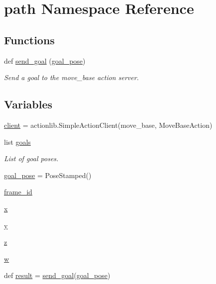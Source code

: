 \hypertarget{namespacepath}{}\section{path Namespace Reference}
\label{namespacepath}
\subsection*{Functions}
\begin{DoxyCompactItemize}
\item 
def \hyperlink{namespacepath_a2db4ca25204e9a7df7493344494d5a10}{send\+\_\+goal} (\hyperlink{namespacepath_a293cea0a504fa4dcccc4e27229ca89ae}{goal\+\_\+pose})
\begin{DoxyCompactList}\small\item\em Send a goal to the move\+\_\+base action server. \end{DoxyCompactList}\end{DoxyCompactItemize}
\subsection*{Variables}
\begin{DoxyCompactItemize}
\item 
\hyperlink{namespacepath_afeeab767bfbbb7e3c54d5df73bfdb8d8}{client} = actionlib.\+Simple\+Action\+Client(\textquotesingle{}move\+\_\+base\textquotesingle{}, Move\+Base\+Action)
\item 
list \hyperlink{namespacepath_a877836c262e905b21652b96e33c06fc5}{goals}
\begin{DoxyCompactList}\small\item\em List of goal poses. \end{DoxyCompactList}\item 
\hyperlink{namespacepath_a293cea0a504fa4dcccc4e27229ca89ae}{goal\+\_\+pose} = Pose\+Stamped()
\item 
\hyperlink{namespacepath_a4cc7d1dff632eb836dcba3e28c989d10}{frame\+\_\+id}
\item 
\hyperlink{namespacepath_afe6191924049eb7f282c32e77c383d23}{x}
\item 
\hyperlink{namespacepath_a2b9fe9b689f51d56430ac93944f60795}{y}
\item 
\hyperlink{namespacepath_a568fb423fb5588e9d0a43fa8a38b88c5}{z}
\item 
\hyperlink{namespacepath_a6b3a1b480dee3e2ccc2fda3d677fefbc}{w}
\item 
def \hyperlink{namespacepath_aefd1f3fdd2ce8dfc178f566e7ffbc0e6}{result} = \hyperlink{namespacepath_a2db4ca25204e9a7df7493344494d5a10}{send\+\_\+goal}(\hyperlink{namespacepath_a293cea0a504fa4dcccc4e27229ca89ae}{goal\+\_\+pose})
\end{DoxyCompactItemize}


